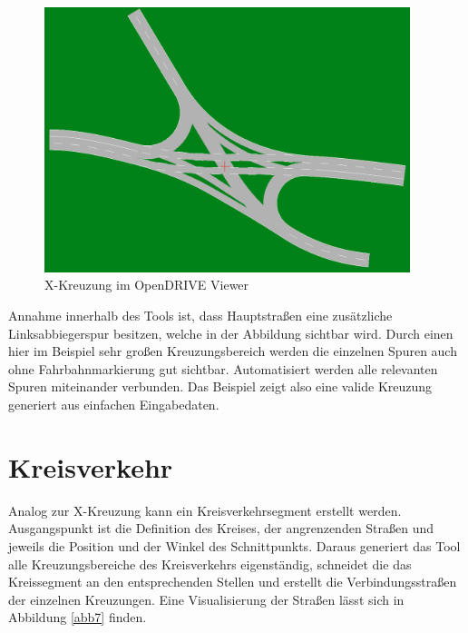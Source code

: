 \begin{figure}[H]
\flushleft
\includegraphics[width=0.95\textwidth]{fig/fig6.png}
\caption{X-Kreuzung im OpenDRIVE Viewer}
\label{abb6}
\end{figure}

Annahme innerhalb des Tools ist, dass Hauptstraßen eine zusätzliche Linksabbiegerspur besitzen, welche in der Abbildung sichtbar wird. Durch einen hier im Beispiel sehr großen Kreuzungsbereich werden die einzelnen Spuren auch ohne Fahrbahnmarkierung gut sichtbar. Automatisiert werden alle relevanten Spuren miteinander verbunden. Das Beispiel zeigt also eine valide Kreuzung generiert aus einfachen Eingabedaten.

\section{Kreisverkehr}
Analog zur X-Kreuzung kann ein Kreisverkehrsegment erstellt werden. Ausgangspunkt ist die Definition des Kreises, der angrenzenden Straßen und jeweils die Position und der Winkel des Schnittpunkts. Daraus generiert das Tool alle Kreuzungsbereiche des Kreisverkehrs eigenständig, schneidet die das Kreissegment an den entsprechenden Stellen und erstellt die Verbindungsstraßen der einzelnen Kreuzungen. Eine Visualisierung der Straßen lässt sich in Abbildung \ref{abb7} finden.

